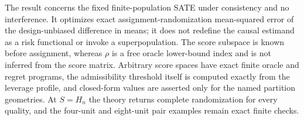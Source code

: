The result concerns the fixed finite-population SATE under consistency and no interference.  It optimizes exact assignment-randomization mean-squared error of the design-unbiased difference in means; it does not redefine the causal estimand as a risk functional or invoke a superpopulation.  The score subspace is known before assignment, whereas \(\rho\) is a free oracle lower-bound index and is not inferred from the score matrix.  Arbitrary score spaces have exact finite oracle and regret programs, the admissibility threshold itself is computed exactly from the leverage profile, and closed-form values are asserted only for the named partition geometries.  At \(S=H_n\) the theory returns complete randomization for every quality, and the four-unit and eight-unit pair examples remain exact finite checks.